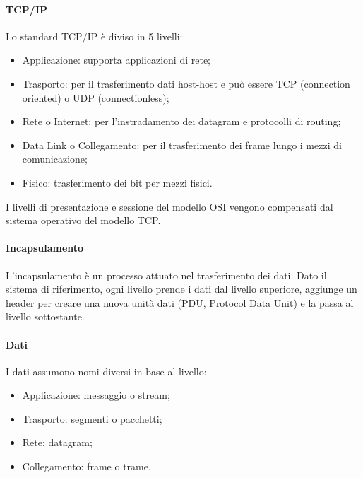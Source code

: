 \documentclass{subfiles}
\begin{document}
    \paragraph{TCP/IP}
    Lo standard TCP/IP è diviso in 5 livelli:
    \begin{itemize}
        \item Applicazione: supporta applicazioni di rete;
        \item Trasporto: per il trasferimento dati host-host e può essere TCP (connection oriented) o UDP (connectionless);
        \item Rete o Internet: per l'instradamento dei datagram e protocolli di routing;
        \item Data Link o Collegamento: per il trasferimento dei frame lungo i mezzi di comunicazione;
        \item Fisico: trasferimento dei bit per mezzi fisici.
    \end{itemize}
    
    \begin{Note*}
        I livelli di presentazione e sessione del modello OSI vengono compensati dal sistema operativo del modello TCP.
    \end{Note*}

    \paragraph{Incapsulamento}
    L'incapsulamento è un processo attuato nel trasferimento dei dati. Dato il sistema di riferimento, ogni livello prende i dati dal 
    livello superiore, aggiunge un header per creare una nuova unità dati (PDU, Protocol Data Unit) e la passa al livello sottostante.
    
    \paragraph{Dati}
    I dati assumono nomi diversi in base al livello:
    \begin{itemize}
        \item Applicazione: messaggio o stream;
        \item Trasporto: segmenti o pacchetti;
        \item Rete: datagram;
        \item Collegamento: frame o trame.
    \end{itemize}
\end{document}
